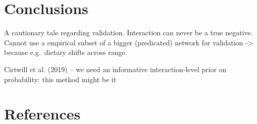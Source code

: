 \documentclass[11pt]{article}
\begin{document}
\hypertarget{conclusions}{%
\section{Conclusions}\label{conclusions}}

A cautionary tale regarding validation. Interaction can never be a true
negative. Cannot use a empirical subset of a bigger (predicated) network
for validation -\textgreater{} because e.g.~dietary shifts across range.

Cirtwill et al. (2019) -- we need an informative interaction-level prior
on probability: this method might be it

\hypertarget{references}{%
\section*{References}\label{references}}
\end{document}
